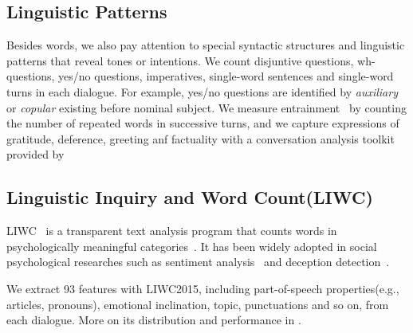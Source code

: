 \subsection*{Linguistic Patterns}
Besides words, we also pay attention to special syntactic structures 
and linguistic patterns that reveal tones or intentions. 
We count disjuntive questions, wh-questions, 
yes/no questions, imperatives, single-word sentences and 
single-word turns in each dialogue. 
For example, yes/no questions are identified by \textit{auxiliary} or 
\textit{copular} existing before nominal subject. 
We measure entrainment~\cite{entrainment} by counting the number of
repeated words in successive turns, 
and we capture expressions of gratitude, deference, greeting anf factuality with a conversation analysis toolkit provided by~\citeauthor{politeness}~ 



\subsection*{Linguistic Inquiry and Word Count(LIWC)}
LIWC~\cite{liwc} is a transparent text analysis program that counts words in psychologically 
meaningful categories~\cite{liwc2}. It has been widely adopted in social psychological researches 
such as sentiment analysis~\cite{sentiment} and deception detection~\cite{deception}.

We extract 93 features with LIWC2015, including part-of-speech properties(e.g., articles, pronouns), 
emotional inclination, topic, punctuations and so on, from each dialogue. More on its distribution and performance in .
